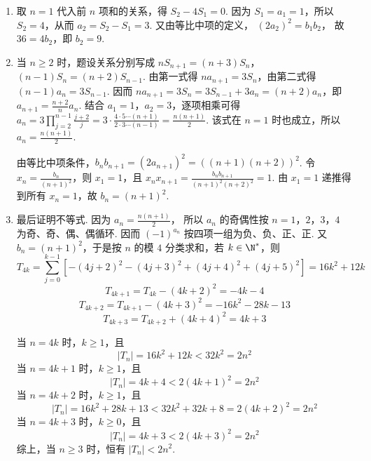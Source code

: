 \begin{solution}
\begin{enumerate}
\item
取 \(n=1\) 代入前 \(n\) 项和的关系，得
\(S_2-4S_1=0\).
因为 \(S_1=a_1=1\)，所以 \(S_2=4\)，从而 \(a_2=S_2-S_1=3\). 又由等比中项的定义，
\((2a_2)^2=b_1b_2\)，
故 \(36=4b_2\)，即 \(b_2=9\).

\item
当 \(n\geqslant2\) 时，题设关系分别写成 \(nS_{n+1}=(n+3)S_n\)，\((n-1)S_n=(n+2)S_{n-1}\).
由第一式得 \(na_{n+1}=3S_n\)，由第二式得 \((n-1)a_n=3S_{n-1}\). 因而
\(na_{n+1}=3S_n=3S_{n-1}+3a_n=(n+2)a_n\)，即 \(a_{n+1}=\frac{n+2}{n}a_n\). 结合 \(a_1=1\)，\(a_2=3\)，逐项相乘可得 \(a_n=3\prod_{j=2}^{n-1}\frac{j+2}{j}=3\cdot\frac{4\cdot5\cdots(n+1)}{2\cdot3\cdots(n-1)}=\frac{n(n+1)}2\). 该式在 \(n=1\) 时也成立，所以 \(a_n=\frac{n(n+1)}2\).

由等比中项条件，\(b_nb_{n+1}=(2a_{n+1})^2=\left((n+1)(n+2)\right)^2\). 令 \(x_n=\frac{b_n}{(n+1)^2}\)，则 \(x_1=1\)，且 \(x_nx_{n+1}=\frac{b_nb_{n+1}}{(n+1)^2(n+2)^2}=1\). 由 \(x_1=1\) 递推得到所有 \(x_n=1\)，故 \(b_n=(n+1)^2\).

\item
最后证明不等式. 因为 \(a_n=\frac{n(n+1)}2\)，
所以 \(a_n\) 的奇偶性按 \(n=1\)，\(2\)，\(3\)，\(4\) 为奇、奇、偶、偶循环. 因而 \((-1)^{a_n}\) 按四项一组为负、负、正、正. 又 \(b_n=(n+1)^2\)，于是按 \(n\) 的模 \(4\) 分类求和，若 \(k\in\N^{*}\)，则
\[
T_{4k}=\sum_{j=0}^{k-1}\left[-(4j+2)^2-(4j+3)^2+(4j+4)^2+(4j+5)^2\right]=16k^2+12k
\]
\[
T_{4k+1}=T_{4k}-(4k+2)^2=-4k-4
\]
\[
T_{4k+2}=T_{4k+1}-(4k+3)^2=-16k^2-28k-13
\]
\[
T_{4k+3}=T_{4k+2}+(4k+4)^2=4k+3
\]

当 \(n=4k\) 时，\(k\geqslant1\)，且
\[
|T_n|=16k^2+12k<32k^2=2n^2
\]
当 \(n=4k+1\) 时，\(k\geqslant1\)，且
\[
|T_n|=4k+4<2(4k+1)^2=2n^2
\]
当 \(n=4k+2\) 时，\(k\geqslant1\)，且
\[
|T_n|=16k^2+28k+13<32k^2+32k+8=2(4k+2)^2=2n^2
\]
当 \(n=4k+3\) 时，\(k\geqslant0\)，且
\[
|T_n|=4k+3<2(4k+3)^2=2n^2
\]
综上，当 \(n\geqslant3\) 时，恒有 \(|T_n|<2n^2\).
\end{enumerate}
\end{solution}
